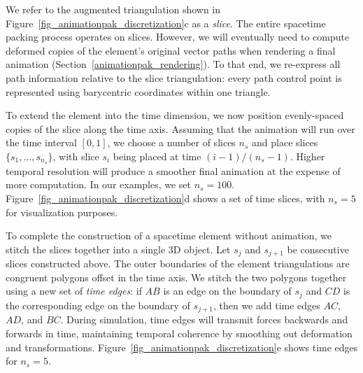 We refer to the augmented triangulation shown in 
Figure~\ref{fig_animationpak_discretization}c as a \textit{slice}.  
The entire spacetime packing process operates on slices.  
However, we will eventually
need to compute deformed copies of the element's original vector paths 
when rendering a final animation (Section~\ref{animationpak_rendering}).
To that end, we re-express all path information relative to the
slice triangulation: every path control point is represented using
barycentric coordinates within one triangle.

To extend the element into the time dimension, 
we now position evenly-spaced copies of the slice along the time axis.
Assuming that the animation will run over the time interval $[0,1]$, 
we choose a number of slices $n_s$ and place slices $\{s_1,\ldots,s_{n_s}\}$,
with slice $s_i$ being placed at time $(i-1)/(n_s-1)$.
Higher temporal resolution will
produce a smoother final animation at the expense of more computation.
In our examples, we set $n_s=100$. 
Figure~\ref{fig_animationpak_discretization}d shows a set of time slices, with
$n_s=5$ for visualization purposes.

To complete the construction of a spacetime element without animation,
we stitch the slices together into a single 3D object.  Let $s_j$ and
$s_{j+1}$ be consecutive slices constructed above.  The outer boundaries
of the element triangulations are congruent polygons offset in the time 
axis.  We stitch the two polygons together using a new set of 
\textit{time edges}: if $AB$ is an edge on the boundary of $s_j$ and
$CD$ is the corresponding edge on the boundary of $s_{j+1}$, then
we add time edges $AC$, $AD$, and $BC$.
During simulation, time edges will transmit forces backwards and forwards in
time, maintaining temporal coherence by smoothing out deformation and 
transformations.
Figure~\ref{fig_animationpak_discretization}e shows time edges for $n_s=5$.

